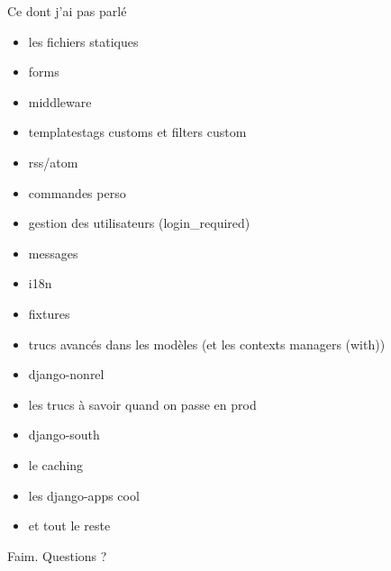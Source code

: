 \documentclass{beamer}
\begin{document}
\begin{frame}[fragile]{Ce dont j'ai pas parlé}
    \begin{itemize}
        \item les fichiers statiques
        \item forms
        \item middleware
        \item templatestags customs et filters custom
        \item rss/atom
        \item commandes perso
        \item gestion des utilisateurs (login\_required)
        \item messages
        \item i18n
        \item fixtures
        \item trucs avancés dans les modèles (et les contexts managers (with))
        \item django-nonrel
        \item les trucs à savoir quand on passe en prod
        \item django-south
        \item le caching
        \item les django-apps cool
        \item et tout le reste
    \end{itemize}
\end{frame}

\begin{frame}[fragile]{}
\begin{LARGE}
\begin{center}
Faim. Questions ?
\end{center}
\end{LARGE}
\end{frame}


\end{document}
